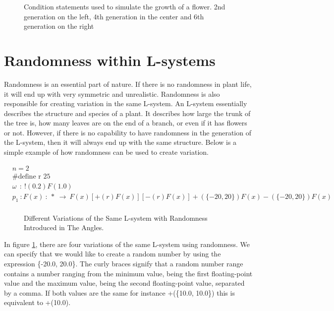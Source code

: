 \begin{figure}[htbp]
	{\centering
		\vspace{7px}
		\setlength{\fboxrule}{1pt}
		\caption{Condition statements used to simulate the growth of a flower. 2nd generation on the left, 4th generation in the center and 6th generation on the right}
	}
\end{figure}
\FloatBarrier

\section{Randomness within L-systems} \label{Randomness L-system Subsection}

Randomness is an essential part of nature. If there is no randomness in plant life, it will end up with very symmetric and unrealistic. Randomness is also responsible for creating variation in the same L-system. An L-system essentially describes the structure and species of a plant. It describes how large the trunk of the tree is, how many leaves are on the end of a branch, or even if it has flowers or not. However, if there is no capability to have randomness in the generation of the L-system, then it will always end up with the same structure. 
\vspace{5mm}
Below is a simple example of how randomness can be used to create variation.

\begin{equation} \label{randomness example}
\begin{aligned}
	&n=2\\
	&\text{\#define r 25} \\
	&\omega~~ :~ !(0.2)F(1.0)\\
	&p_1~ :  F(x)~ :~ *~ \rightarrow~ F(x)[+(r)F(x)][-(r)F(x)]+(\{-20, 20\})F(x)-(\{-20, 20\})F(x)\\
\end{aligned}
\end{equation}

\begin{figure}[htbp]

	{\centering
		\setlength{\fboxrule}{0pt}
		\caption{Different Variations of the Same L-system with Randomness Introduced in The Angles. \label{figRandomness}}
	}
\end{figure}
\FloatBarrier

\noindent
In figure \ref{figRandomness}, there are four variations of the same L-system using randomness. We can specify that we would like to create a random number by using the expression \{-20.0, 20.0\}. The curly braces signify that a random number range contains a number ranging from the minimum value, being the first floating-point value and the maximum value, being the second floating-point value, separated by a comma. If both values are the same for instance +(\{10.0, 10.0\}) this is equivalent to +(10.0).

